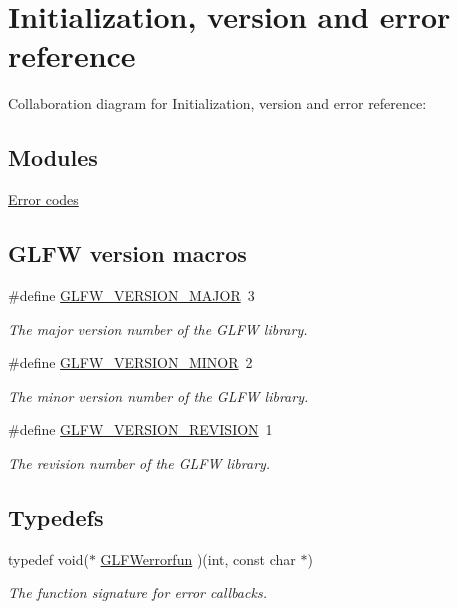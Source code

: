 \hypertarget{group__init}{
\section{Initialization, version and error reference}
\label{group__init}
}


Collaboration diagram for Initialization, version and error reference:\subsection*{Modules}
\begin{CompactItemize}
\item 
\hyperlink{group__errors}{Error codes}
\end{CompactItemize}
\subsection*{GLFW version macros}
\begin{CompactItemize}
\item 
\#define \hyperlink{group__init_g6337d9ea43b22fc529b2bba066b4a576}{GLFW\_\-VERSION\_\-MAJOR}~3
\begin{CompactList}\small\item\em The major version number of the GLFW library. \item\end{CompactList}\item 
\#define \hyperlink{group__init_gf80d40f0aea7088ff337606e9c48f7a3}{GLFW\_\-VERSION\_\-MINOR}~2
\begin{CompactList}\small\item\em The minor version number of the GLFW library. \item\end{CompactList}\item 
\#define \hyperlink{group__init_gb72ae2e2035d9ea461abc3495eac0502}{GLFW\_\-VERSION\_\-REVISION}~1
\begin{CompactList}\small\item\em The revision number of the GLFW library. \item\end{CompactList}\end{CompactItemize}
\subsection*{Typedefs}
\begin{CompactItemize}
\item 
typedef void($\ast$ \hyperlink{group__init_g6f2c8574259246a83b1d0c3baf23046f}{GLFWerrorfun} )(int, const char $\ast$)
\begin{CompactList}\small\item\em The function signature for error callbacks. \item\end{CompactList}\end{CompactItemize}
